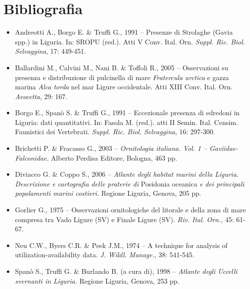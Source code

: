 \section*{Bibliografia}
\begin{itemize}\itemsep0pt
	\item Andreotti A., Borgo E. \& Truffi G., 1991 -- Presenze di Strolaghe
(Gavia spp.) in Liguria. In: SROPU (red.). Atti V Conv. Ital. Orn.
\textit{Suppl. Ric. Biol. }\textit{Selvaggina}, 17: 449-451.

	\item Ballardini M., Calvini M., Nani B. \& Toffoli R., 2005 -- Osservazioni
su presenza e distribuzione di pulcinella di mare \textit{Fratercula
arctica} e gazza marina \textit{Alca torda} nel mar Ligure occidentale.
Atti XIII Conv. Ital. Orn. \textit{Avocetta}, 29: 167.

	\item Borgo E., Span\`o S. \& Truffi G., 1991 -- Eccezionale presenza di
edredoni in Liguria: dati quantitativi. In: Fasola M. (red.). atti II
Semin. Ital. Censim. Faunistici dei Vertebrati. \textit{Suppl. Ric.
Biol. Selvaggina}, 16: 297-300.

	\item Brichetti P. \& Fracasso G., 2003 -- \textit{Ornitologia italiana. Vol.
1 -- Gaviidae-Falconidae.} Alberto Perdisa Editore, Bologna, 463 pp.

	\item Diviacco G. \& Coppo S., 2006 -- \textit{Atlante degli habitat marini
della Liguria. Descrizione e cartografia delle praterie di }Posidonia
oceanica\textit{ e dei principali popolamenti marini costieri.} Regione
Liguria, Genova, 205 pp.

	\item Gorlier G., 1975 -- Osservazioni ornitologiche del litorale e della zona
di mare compresa tra Vado Ligure (SV) e Finale Ligure (SV).
\textit{Riv. Ital. Orn.,} 45: 61-67.

	\item Neu C.W., Byers C.R. \& Peek J.M., 1974 -- A technique for analysis of
utilization-availability data. \textit{J. Wildl. Manage.}, 38: 541-545.

	\item Span\`o S., Truffi G. \& Burlando B. (a cura di), 1998 --
\textit{Atlante degli Uccelli svernanti in Liguria.} Regione Liguria,
Genova, 253 pp.
\end{itemize}
